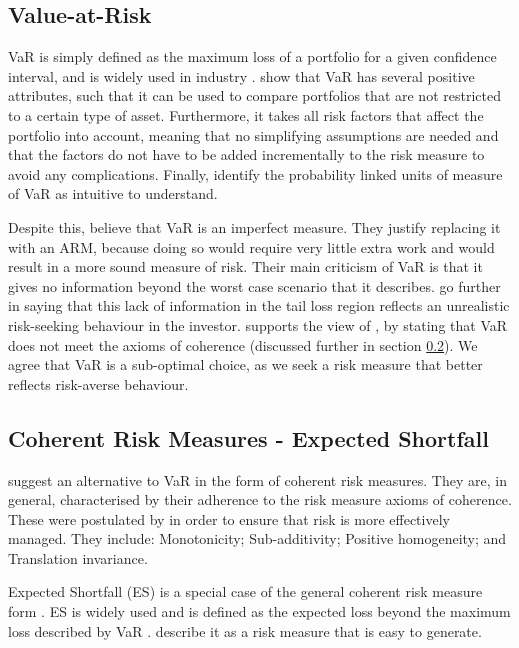 \documentclass[12pt,a4paper]{article}
\begin{document}
\subsection{Value-at-Risk}
\label{subsec:VaR}

VaR is simply defined as the maximum loss  of a portfolio for a given confidence interval, and is widely used in industry \citep{consiglirisk}. \cite{dowd2006after} show that VaR has several positive attributes, such that it can be used to compare portfolios that are not restricted to a certain type of asset. Furthermore, it takes all risk factors that affect the portfolio into account, meaning that no simplifying assumptions are needed and that the factors do not have to be added incrementally to the risk measure to avoid any complications. Finally, \cite{dowd2006after} identify the probability linked units of measure of VaR as intuitive to understand.

Despite this, \cite{dowd2006after} believe that VaR is an imperfect measure. They justify replacing it with an ARM, because doing so would require very little extra work and would result in a more sound measure of risk. Their main criticism of VaR is that it gives no information beyond the worst case scenario that it describes. \cite{dowd2006after} go further in saying that this lack of information in the tail loss region reflects an unrealistic risk-seeking behaviour in the investor. \cite{ACERBI20021505} supports the view of \cite{dowd2006after}, by stating that VaR does not meet the axioms of coherence (discussed further in section \ref{subsec:ES}). We agree that VaR is a sub-optimal choice, as we seek a risk measure that better reflects risk-averse behaviour.

\subsection{Coherent Risk Measures - Expected Shortfall}
\label{subsec:ES}

\cite{dowd2006after} suggest an alternative to VaR in the form of coherent risk measures. They are, in general, characterised by their adherence to the risk measure axioms of coherence. These were postulated by \citet*{artzner1999coherent} in order to ensure that risk is more effectively managed. They include: Monotonicity; Sub-additivity; Positive homogeneity; and Translation invariance.

Expected Shortfall (ES) is a special case of the general coherent risk measure form \citep{ACERBI20021505}. ES is widely used and is defined as the expected loss beyond the maximum loss described by VaR \citep{consiglirisk}. \cite{dowd2006after} describe it as a risk measure that is easy to generate.
\end{document}
